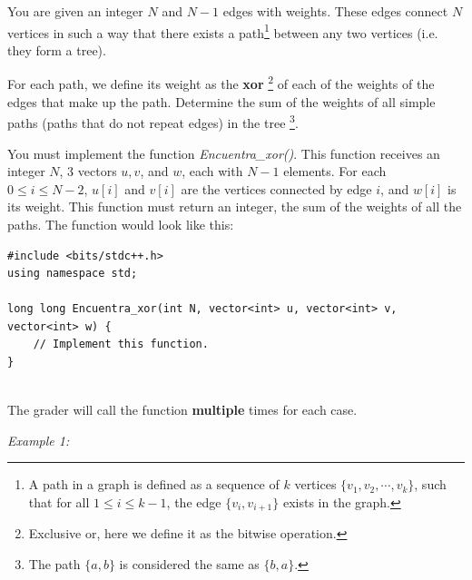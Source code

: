 \documentclass[12pt]{scrartcl}
\begin{document}
    
    
    \vspace{10pt}

    
    
        You are given an integer $N$ and $N - 1$ edges with weights. These edges connect $N$ vertices in such a way that there exists a path\footnote{A path in a graph is defined as a sequence of $k$ vertices $\{v_1, v_2, \cdots , v_k\}$, such that for all $1 \le i \le k - 1$, the edge $\{v_i, v_{i + 1}\}$ exists in the graph. } between any two vertices (i.e. they form a tree).
        
        For each path, we define its weight as the {\bfseries xor} \footnote{Exclusive or, here we define it as the bitwise operation.} of each of the weights of the edges that make up the path. Determine the sum of the weights of all simple paths (paths that do not repeat edges) in the tree \footnote{The path $\{a, b\}$ is considered the same as $\{b, a\}$.}.
        

        You must implement the function \textit{Encuentra\_xor()}. This function receives an integer $N$, 3 vectors $u, v$, and $w$, each with $N - 1$ elements. For each $0 \le i \le N - 2$, $u[i]$ and $v[i]$ are the vertices connected by edge $i$, and $w[i]$ is its weight. This function must return an integer, the sum of the weights of all the paths.
        The function would look like this:

\begin{verbatim}
#include <bits/stdc++.h>
using namespace std;

long long Encuentra_xor(int N, vector<int> u, vector<int> v, vector<int> w) {
    // Implement this function.
}
    
\end{verbatim}

    The grader will call the function \textbf{multiple} times for each case.


               
        {\itshape Example 1:}
        
\end{document}

